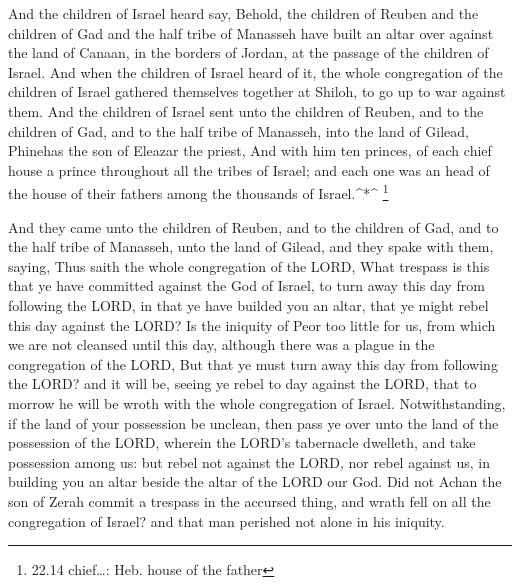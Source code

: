  And the children of Israel heard say, Behold, the children
of Reuben and the children of Gad and the half tribe of Manasseh have
built an altar over against the land of Canaan, in the borders of
Jordan, at the passage of the children of Israel.  And when
the children of Israel heard of it, the whole congregation of the
children of Israel gathered themselves together at Shiloh, to go up to
war against them.  And the children of Israel sent unto the
children of Reuben, and to the children of Gad, and to the half tribe of
Manasseh, into the land of Gilead, Phinehas the son of Eleazar the
priest,  And with him ten princes, of each chief house a
prince throughout all the tribes of Israel; and each one was an head of
the house of their fathers among the thousands of Israel.\^{}*\^{}
\footnote{22.14 chief\ldots: Heb. house of the father}

 And they came unto the children of Reuben, and to the
children of Gad, and to the half tribe of Manasseh, unto the land of
Gilead, and they spake with them, saying,  Thus saith the
whole congregation of the LORD, What trespass is this that ye have
committed against the God of Israel, to turn away this day from
following the LORD, in that ye have builded you an altar, that ye might
rebel this day against the LORD?  Is the iniquity of Peor
too little for us, from which we are not cleansed until this day,
although there was a plague in the congregation of the LORD,
 But that ye must turn away this day from following the
LORD? and it will be, seeing ye rebel to day against the LORD, that to
morrow he will be wroth with the whole congregation of Israel.
 Notwithstanding, if the land of your possession be
unclean, then pass ye over unto the land of the possession of the LORD,
wherein the LORD's tabernacle dwelleth, and take possession among us:
but rebel not against the LORD, nor rebel against us, in building you an
altar beside the altar of the LORD our God.  Did not Achan
the son of Zerah commit a trespass in the accursed thing, and wrath fell
on all the congregation of Israel? and that man perished not alone in
his iniquity.

